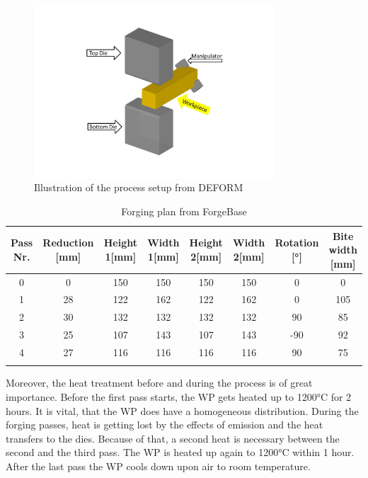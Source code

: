\begin{figure}[!htbp]
 \centering
 \includegraphics[width=0.8\textwidth]{images/processsetup}
 \caption{Illustration of the process setup from DEFORM}
 \label{img:processsetup}
\end{figure}

\begin{table}[!htbp][width=1\textwidth]
 \centering
 \caption{Forging plan from ForgeBase}
 \begin{tabular}{|c|c|c|c|c|c|c|c|}
 \hline
 Pass Nr.&Reduction [mm]&Height 1[mm]&Width 1[mm]&Height 2[mm]&Width 2[mm]&Rotation [°]&Bite width [mm]\\
 \hline
 0&0&150&150&150&150&0&0\\
 \hline
 1&28&122&162&122&162&0&105\\
 \hline
 2&30&132&132&132&132&90&85\\
 \hline
 3&25&107&143&107&143&-90&92\\
 \hline
 4&27&116&116&116&116&90&75\\
 \hline
 \label{table:forgingplan}
 \end{tabular}
\end{table}

Moreover, the heat treatment before and during the process is of great importance. Before the first pass starts, the WP gets heated up to 1200°C for 2 hours. It is vital, that the WP does have a homogeneous distribution. During the forging passes, heat is getting lost by the effects of emission and the heat transfers to the dies. Because of that, a second heat is necessary between the second and the third pass. The WP is heated up again to 1200°C within 1 hour. After the last pass the WP cools down upon air to room temperature.
